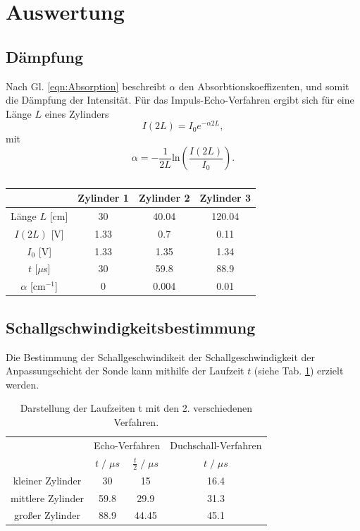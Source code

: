 \section{Auswertung}
\subsection{Dämpfung}
Nach Gl. \ref{eqn:Absorption} beschreibt $\alpha$ den Absorbtionskoeffizenten, und
somit die Dämpfung der Intensität.
Für das Impuls-Echo-Verfahren ergibt sich für eine Länge $L$ eines Zylinders
\begin{equation}
    I(2L)=I_0e^{-\alpha 2L},
\end{equation}
mit
\begin{equation}
    \alpha=-\frac{1}{2L}\text{ln}\left(\frac{I(2L)}{I_0}\right).
\end{equation}
\begin{table}
    \centering
    \begin{tabular}{c|c c c}
        \toprule
        &Zylinder 1 &Zylinder 2&Zylinder 3\\
        \midrule
        Länge $L$ [cm] &30&40.04&120.04\\
        $I(2L)$ [V] &1.33&0.7&0.11\\
        $I_0$ [V]& 1.33&1.35&1.34\\
        $t$ [$\mu$s]&30&59.8&88.9\\
        \midrule
        $\alpha$ [cm$^{-1}$]& 0&0.004&0.01\\
        \bottomrule
    \end{tabular}
    \caption{}
    \label{tab:wertetabelle}
\end{table}

\subsection{Schallgschwindigkeitsbestimmung}
Die Bestimmung der Schallgeschwindikeit der Schallgeschwindigkeit der Anpassungschicht
der Sonde kann mithilfe der Laufzeit $t$ (siehe Tab. \ref{tab:wertetabelle}) erzielt werden.

\begin{table}
    \centering
    \begin{tabular}{c | c c c}
        \toprule
        &\multicolumn{2}{c}{Echo-Verfahren} & \multicolumn{1}{c}{Duchschall-Verfahren}\\
        \cmidrule(lr){2-3}\cmidrule(lr){4-4}
        & $t\;/\;\mu s$ &  $\frac{t}{2}\;/\;\mu s$& $t\;/\;\mu s$\\ 
        \midrule
        kleiner Zylinder & 30 & 15 & 16.4\\
        mittlere Zylinder & 59.8 &29.9 & 31.3\\
        großer Zylinder & 88.9 &44.45& 45.1\\
        \bottomrule
    \end{tabular}
    \caption{Darstellung der Laufzeiten t mit den 2. verschiedenen Verfahren.}
\end{table}

